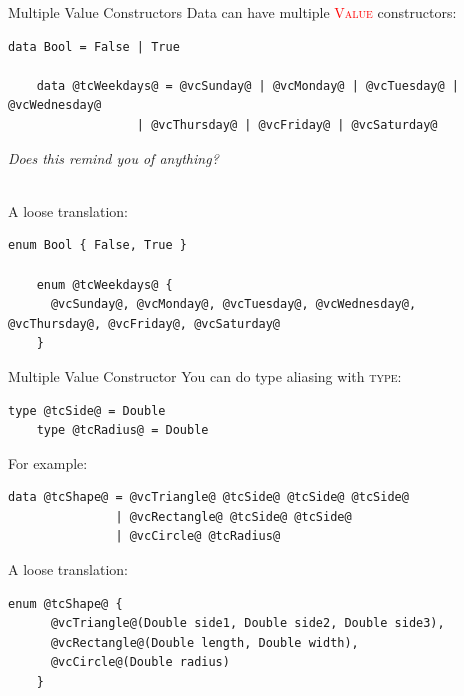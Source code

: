 \documentclass[xcolor={usenames,dvipsnames}]{beamer}
\newcommand{\hkeyword}[1]{\textcolor{TealBlue}{\textsc{#1}}}
\newcommand{\hvalcon}[1]{\textcolor{Red}{\textsc{#1}}}
\begin{document}
\begin{frame}[fragile]{Multiple Value Constructors}
  Data can have multiple \hvalcon{Value} constructors:
  \begin{lstlisting}[style=hask]
    data Bool = False | True

    data @tcWeekdays@ = @vcSunday@ | @vcMonday@ | @vcTuesday@ | @vcWednesday@
                  | @vcThursday@ | @vcFriday@ | @vcSaturday@
  \end{lstlisting}
  \textit{\tiny{Does this remind you of anything?}}

  \pause
  \ \\
  A loose translation:
  \begin{lstlisting}[style=hask]
    enum Bool { False, True }

    enum @tcWeekdays@ {
      @vcSunday@, @vcMonday@, @vcTuesday@, @vcWednesday@, @vcThursday@, @vcFriday@, @vcSaturday@
    }
  \end{lstlisting}
\end{frame}

\begin{frame}[fragile]{Multiple Value Constructor}
  You can do type aliasing with \hkeyword{type}:
  \begin{lstlisting}[style=hask]
    type @tcSide@ = Double
    type @tcRadius@ = Double
  \end{lstlisting}

  \pause
  For example:
  \begin{lstlisting}[style=hask]
    data @tcShape@ = @vcTriangle@ @tcSide@ @tcSide@ @tcSide@
               | @vcRectangle@ @tcSide@ @tcSide@
               | @vcCircle@ @tcRadius@
  \end{lstlisting}

  \pause
  A loose translation:
  \begin{lstlisting}[style=hask]
    enum @tcShape@ {
      @vcTriangle@(Double side1, Double side2, Double side3),
      @vcRectangle@(Double length, Double width),
      @vcCircle@(Double radius)
    }
  \end{lstlisting}
\end{frame}
\end{document}
